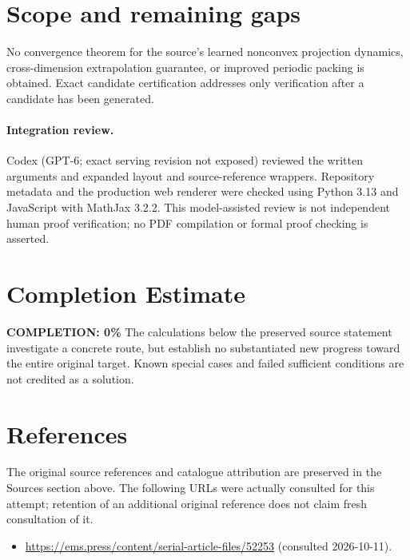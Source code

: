 \documentclass[11pt]{article}
\begin{document}
\section{Scope and remaining gaps}
No convergence theorem for the source's learned nonconvex projection dynamics, cross-dimension extrapolation guarantee, or improved periodic packing is obtained. Exact candidate certification addresses only verification after a candidate has been generated.
\paragraph{Integration review.} Codex (GPT-6; exact serving revision not exposed) reviewed the written arguments and expanded layout and source-reference wrappers. Repository metadata and the production web renderer were checked using Python 3.13 and JavaScript with MathJax 3.2.2. This model-assisted review is not independent human proof verification; no PDF compilation or formal proof checking is asserted.

\section{Completion Estimate}
\noindent\textbf{COMPLETION: 0\%}
The calculations below the preserved source statement investigate a concrete route,
but establish no substantiated new progress toward the entire original target.
Known special cases and failed sufficient conditions are not credited as a solution.
\section{References}
The original source references and catalogue attribution are preserved in the
Sources section above. The following URLs were actually consulted for this attempt;
retention of an additional original reference does not claim fresh consultation of it.
\begin{itemize}
\item \url{https://ems.press/content/serial-article-files/52253} (consulted 2026-10-11). 
\end{itemize}
\end{document}
